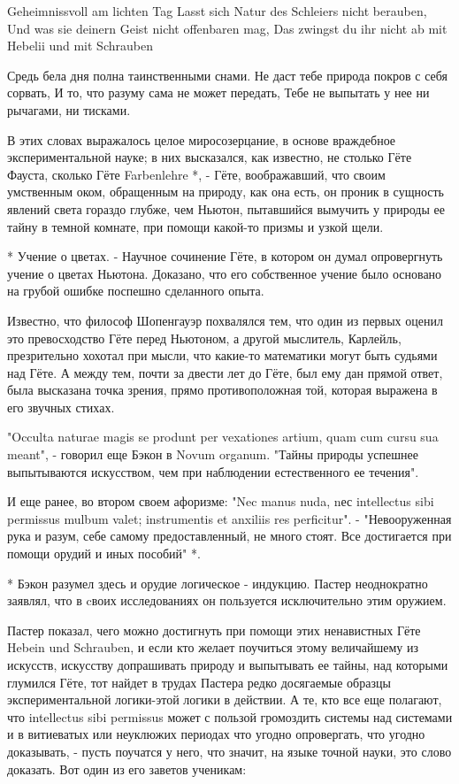 Geheimnissvoll am lichten Tag
Lasst sich Natur des Schleiers nicht berauben,
Und was sie deinern Geist nicht offenbaren mag,
Das zwingst du ihr nicht ab mit Hebelii und mit Schrauben

Средь бела дня полна таинственными снами.
Не даст тебе природа покров с себя сорвать,
И то, что разуму сама не может передать,
Тебе не выпытать у нее ни рычагами, ни тисками.

В этих  словах  выражалось  целое миросозерцание,  в  основе  враждебное
экспериментальной науке; в них высказался, как известно, не столько Гёте
Фауста, сколько  Гёте Farbenlehre  *, -  Гёте, воображавший,  что  своим
умственным оком,  обращенным  на природу,  как  она есть,  он  проник  в
сущность явлений света гораздо глубже, чем Ньютон, пытавшийся вымучить у
природы ее тайну в  темной комнате, при помощи  какой-то призмы и  узкой
щели.

* Учение о цветах. - Научное сочинение Гёте, в котором он думал
опровергнуть учение о цветах Ньютона. Доказано, что его собственное
учение было основано на грубой ошибке поспешно сделанного опыта.

Известно, что  философ Шопенгауэр  похвалялся тем,  что один  из  первых
оценил это  превосходство  Гёте  перед  Ньютоном,  а  другой  мыслитель,
Карлейль, презрительно хохотал при мысли, что какие-то математики  могут
быть судьями над Гёте. А между тем, почти за двести лет до Гёте, был ему
дан прямой  ответ, была  высказана точка  зрения, прямо  противоположная
той, которая выражена в его звучных стихах.

"Occulta naturae magis se produnt per vexationes artium, quam cum  cursu
sua meant", - говорил еще Бэкон в Novum organum. "Тайны природы успешнее
выпытываются искусством, чем при наблюдении естественного ее течения".

И еще ранее, во втором своем афоризме: "Nec manus nuda, nес  intellectus
sibi permissus mulbum valet; instrumentis et anxiliis res perficitur". -
"Невооруженная рука  и  разум,  себе самому  предоставленный,  не  много
стоят. Все достигается при помощи орудий и иных пособий" *.

* Бэкон разумел здесь и орудие логическое - индукцию. Пастер
неоднократно заявлял, что в cвоих исследованиях он пользуется
исключительно этим оружием.

Пастер показал, чего можно достигнуть  при помощи этих ненавистных  Гёте
Hebein und Schrauben, и если  кто желает поучиться этому величайшему  из
искусств, искусству  допрашивать  природу  и выпытывать  ее  тайны,  над
которыми глумился Гёте,  тот найдет  в трудах  Пастера редко  досягаемые
образцы экспериментальной логики-этой логики в  действии. А те, кто  все
еще полагают, что intellectus sibi permissus может с пользой  громоздить
системы над системами и в  витиеватых или неуклюжих периодах что  угодно
опровергать, что угодно доказывать, - пусть поучатся у него, что значит,
на языке  точной науки,  это слово  доказать. Вот  один из  его  заветов
ученикам:

